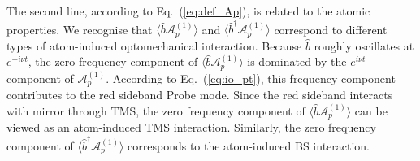 \documentclass[aps, pra, reprint, amsmath, amssymb, groupedaddress, acknowledgments]{revtex4-1}
\begin{document}
The second line, according to Eq.~(\ref{eq:def_Ap}), is related to the atomic properties.  
We recognise that $\langle \hat{b}\mathcal{A}_p^{(1)} \rangle$ and $\langle \hat{b}^\dag \mathcal{A}_p^{(1)} \rangle$ correspond to different types of atom-induced optomechanical interaction.  Because $\hat{b}$ roughly oscillates at $e^{-i\nu t}$, the zero-frequency component of $\langle \hat{b}\mathcal{A}_p^{(1)}\rangle$ is dominated by the $e^{i\nu t}$ component of $\mathcal{A}_p^{(1)}$.  According to Eq.~(\ref{eq:io_pt}), this frequency component contributes to the red sideband Probe mode.  Since the red sideband interacts with mirror through TMS, the zero frequency component of $\langle \hat{b}\mathcal{A}_p^{(1)} \rangle$ can be viewed as an atom-induced TMS interaction.  Similarly, the zero frequency component of $\langle \hat{b}^\dag \mathcal{A}_p^{(1)} \rangle$ corresponds to the atom-induced BS interaction.
\end{document}
